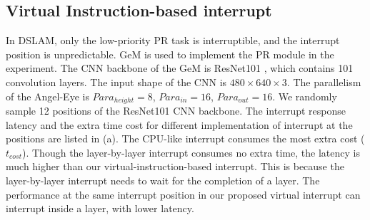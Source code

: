 


\subsection{Virtual Instruction-based interrupt }

In DSLAM, only the low-priority PR task is interruptible, and the interrupt position is unpredictable. GeM \cite{radenovic2018fine} is used to implement the PR module in the experiment.
The CNN backbone of the GeM is ResNet101 \cite{he2016deep}, which contains 101 convolution layers. The input shape of the CNN is $480 \times 640 \times 3$. The parallelism of the Angel-Eye is $Para_{height}=8$, $Para_{in}=16$, $Para_{out}=16$. 
We randomly sample 12 positions of the ResNet101 CNN backbone. The interrupt response latency and the extra time cost for different implementation of interrupt at the positions are listed in (a).
The CPU-like interrupt consumes the most extra cost ($t_{cost}$). Though the layer-by-layer interrupt consumes no extra time, the latency is much higher than our virtual-instruction-based interrupt. 
This is because the layer-by-layer interrupt needs to wait for the completion of a layer. The performance at the same interrupt position in our proposed virtual interrupt can interrupt inside a layer, with lower latency.

\label{sec:viexp}


